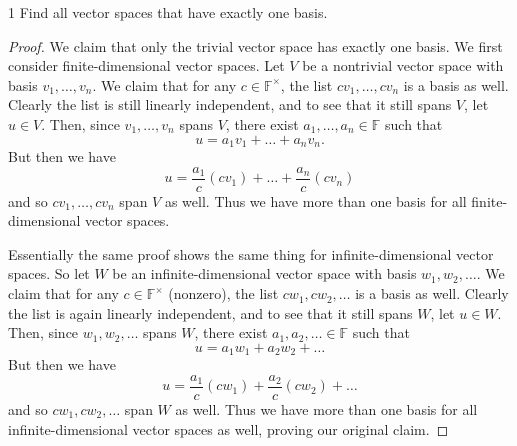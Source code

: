 \documentclass{extarticle}
\newenvironment{problem}[1]{\begin{prob*}{#1}{}}{\end{prob*}}
\newcommand{\F}{\mathbb{F}}
\begin{document}
\begin{problem}{1}
Find all vector spaces that have exactly one basis.
\end{problem}
\begin{proof}
We claim that only the trivial vector space has exactly one basis.  We first consider finite-dimensional vector spaces.  Let $V$ be a nontrivial vector space with basis $v_1,\dots, v_n$.  We claim that for any $c\in\F^\times$, the list $cv_1, \dots, cv_n$ is a basis as well.  Clearly the list is still linearly independent, and to see that it still spans $V$, let $u\in V$.  Then, since $v_1,\dots, v_n$ spans $V$, there exist $a_1,\dots, a_n\in\F$ such that 
\begin{equation*}
u = a_1v_1 + \dots + a_nv_n.
\end{equation*}  
But then we have
\begin{equation*}
u = \frac{a_1}{c}(cv_1) + \dots + \frac{a_n}{c}(cv_n)
\end{equation*}
and so $cv_1,\dots,cv_n$ span $V$ as well.  Thus we have more than one basis for all finite-dimensional vector spaces.
\par Essentially the same proof shows the same thing for infinite-dimensional vector spaces.  So let $W$ be an infinite-dimensional vector space with basis $w_1,w_2,\dots$.  We claim that for any $c\in\F^{\times}$ (nonzero), the list $cw_1,cw_2,\dots$ is a basis as well.  Clearly the list is again linearly independent, and to see that it still spans $W$, let $u\in W$.  Then, since $w_1,w_2,\dots$ spans $W$, there exist $a_1, a_2,\dots \in \F$ such that
\begin{equation*}
u = a_1w_1 + a_2w_2 + \dots
\end{equation*}
But then we have
\begin{equation*}
u = \frac{a_1}{c}(cw_1) + \frac{a_2}{c}(cw_2) + \dots
\end{equation*}
and so $cw_1, cw_2,\dots$ span $W$ as well.  Thus we have more than one basis for all infinite-dimensional vector spaces as well, proving our original claim.
\end{proof}
\end{document}
